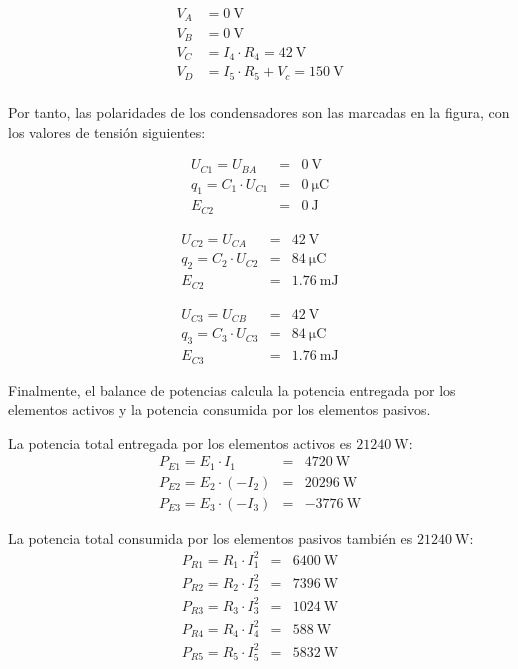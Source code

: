 \documentclass[10pt]{article}
\begin{document}
\begin{align*}
V_A &= \SI{0}{\volt}\\
V_B &= \SI{0}{\volt}\\
V_C &= I_4 \cdot R_4 = \SI{42}{\volt}\\
V_D &= I_5 \cdot R_5 + V_c = \SI{150}{\volt}\\
\end{align*}

Por tanto, las polaridades de los condensadores son las marcadas en la figura, con los valores de tensión siguientes:

\begin{eqnarray*}
U_{C1} = U_{BA} & = & \SI{0}{\volt}\\
q_1 = C_1 \cdot U_{C1} & = & \SI{0}{\micro\coulomb}\\
E_{C2} & = & \SI{0}{\joule}
\end{eqnarray*}

\begin{eqnarray*}
U_{C2} = U_{CA} & = & \SI{42}{\volt}\\
q_2 = C_2 \cdot U_{C2} & = & \SI{84}{\micro\coulomb}\\
E_{C2} & = & \SI{1.76}{\milli\joule}
\end{eqnarray*}

\begin{eqnarray*}
U_{C3} = U_{CB} & = & \SI{42}{\volt}\\
q_3 = C_3 \cdot U_{C3} & = & \SI{84}{\micro\coulomb}\\
E_{C3} & = & \SI{1.76}{\milli\joule}
\end{eqnarray*}

Finalmente, el balance de potencias calcula la potencia entregada por los elementos activos y la potencia consumida por los elementos pasivos.

La potencia total entregada por los elementos activos es $\SI{21240}{\watt}$:
\begin{eqnarray*}
P_{E1} = E_1 \cdot I_1 & = & \SI{4720}{\watt}\\
P_{E2} = E_2 \cdot (-I_2) & = & \SI{20296}{\watt}\\
P_{E3} = E_3 \cdot (-I_3) & = & \SI{-3776}{\watt}
\end{eqnarray*}

La potencia total consumida por los elementos pasivos también es $\SI{21240}{\watt}$:
\begin{eqnarray*}
P_{R1} = R_1 \cdot I_1^2 & = & \SI{6400}{\watt}\\
P_{R2} = R_2 \cdot I_2^2 & = & \SI{7396}{\watt}\\
P_{R3} = R_3 \cdot I_3^2 & = & \SI{1024}{\watt}\\
P_{R4} = R_4 \cdot I_4^2 & = & \SI{588}{\watt}\\
P_{R5} = R_5 \cdot I_5^2 & = & \SI{5832}{\watt}
\end{eqnarray*}
\end{document}
